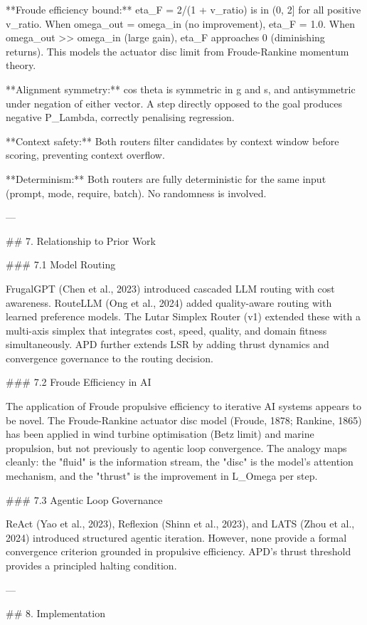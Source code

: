 **Froude efficiency bound:** eta_F = 2/(1 + v_ratio) is in (0, 2] for all positive v_ratio. When omega_out = omega_in (no improvement), eta_F = 1.0. When omega_out >> omega_in (large gain), eta_F approaches 0 (diminishing returns). This models the actuator disc limit from Froude-Rankine momentum theory.

**Alignment symmetry:** cos theta is symmetric in g and s, and antisymmetric under negation of either vector. A step directly opposed to the goal produces negative P_Lambda, correctly penalising regression.

**Context safety:** Both routers filter candidates by context window before scoring, preventing context overflow.

**Determinism:** Both routers are fully deterministic for the same input (prompt, mode, require, batch). No randomness is involved.

---

## 7. Relationship to Prior Work

### 7.1 Model Routing

FrugalGPT (Chen et al., 2023) introduced cascaded LLM routing with cost awareness. RouteLLM (Ong et al., 2024) added quality-aware routing with learned preference models. The Lutar Simplex Router (v1) extended these with a multi-axis simplex that integrates cost, speed, quality, and domain fitness simultaneously. APD further extends LSR by adding thrust dynamics and convergence governance to the routing decision.

### 7.2 Froude Efficiency in AI

The application of Froude propulsive efficiency to iterative AI systems appears to be novel. The Froude-Rankine actuator disc model (Froude, 1878; Rankine, 1865) has been applied in wind turbine optimisation (Betz limit) and marine propulsion, but not previously to agentic loop convergence. The analogy maps cleanly: the "fluid" is the information stream, the "disc" is the model's attention mechanism, and the "thrust" is the improvement in L_Omega per step.

### 7.3 Agentic Loop Governance

ReAct (Yao et al., 2023), Reflexion (Shinn et al., 2023), and LATS (Zhou et al., 2024) introduced structured agentic iteration. However, none provide a formal convergence criterion grounded in propulsive efficiency. APD's thrust threshold provides a principled halting condition.

---

## 8. Implementation

